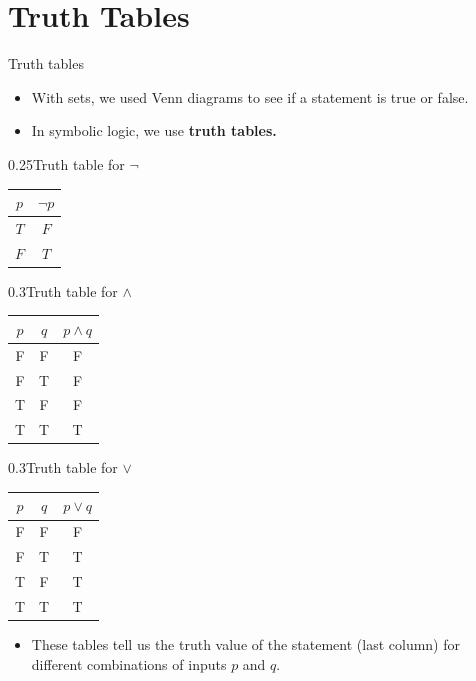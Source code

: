 \documentclass[12pt,aspectratio=1610, handout]{beamer}
\begin{document}
\section{Truth Tables}
\begin{frame}{Truth tables}
	\begin{itemize}
		\item With sets, we used Venn diagrams to see if a statement is true or false. \p
		\item In symbolic logic, we use \textbf{truth tables.}\p
	\end{itemize}
		
	\begin{center}
	\begin{blockz}{0.25}{Truth table for $\neg$}
				\begin{tabular}{|c|c|}
					\hline
					$p$ & $\neg p$ \\
					\hline
					$T$ & $F$ \\
					\hline
					$F$ & $T$ \\
					\hline
				\end{tabular}
		\end{blockz}\hspace{2mm}	\p
	\begin{blockz}{0.3}{Truth table for $\land$}
	\begin{tabular}{|c|c|c|}
		\hline
		$p$ & $q$ & $p \wedge q$ \\
		\hline
		F & F & F\\
		\hline
		F & T & F\\
		\hline
		T&F &F \\ 
		\hline 
		T&T &T \\
		\hline
	\end{tabular}
	\end{blockz}	\hspace{2mm}\p
	\begin{blockz}{0.3}{Truth table for $\lor$}
	\begin{tabular}{|c|c|c|}
		\hline
		$p$ & $q$ & $p \vee q$ \\
		\hline
		F&F &F \\
		\hline
		F&T &T \\
		\hline 
		T&F &T \\
		\hline 
		T& T& T\\ 
		\hline 
	\end{tabular}
	\end{blockz}
\end{center}


\begin{itemize}
	\item These tables tell us the truth value of the statement (last column) for different combinations of inputs $p$ and $q$.
\end{itemize}
\end{frame}
	
\end{document}
